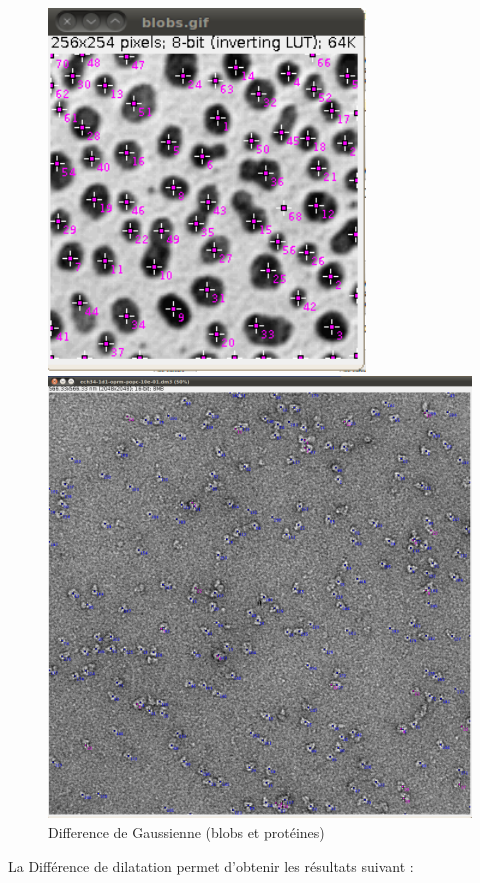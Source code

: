 \begin{figure}[ht]
 \begin{minipage}{.450\linewidth}
  \includegraphics[width=0.75\textwidth]{blobsDog.png}  
 \end{minipage} \hfill
\begin{minipage}{.450\linewidth}
  \includegraphics[width=1\textwidth]{protDog.png}   
 \end{minipage} \hfill
\caption{Difference de Gaussienne (blobs et protéines)}
\end{figure}
La Différence de dilatation permet d'obtenir les résultats suivant :


